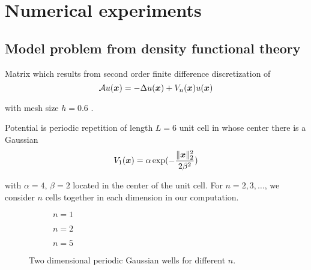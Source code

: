 \chapter{Numerical experiments}
\label{chp:5-experiments}


\section{Model problem from density functional theory}
\label{sec:5-experiments-density-function}


Matrix which results from second order finite difference discretization of
\begin{equation}
    \mathcal{A} u(\boldsymbol{x}) = - \Delta u(\boldsymbol{x}) + V_n(\boldsymbol{x}) u(\boldsymbol{x})
    \label{equ:5-experiments-electronic-hamiltonian}
\end{equation}

with mesh size $h=0.6$ \cite{lin2017randomized}.

Potential is periodic repetition of length $L=6$ unit cell in whose
center there is a Gaussian
\begin{equation}
    V_1(\boldsymbol{x}) = \alpha \exp(-\frac{\lVert \boldsymbol{x} \rVert _2^2}{ 2 \beta^2 })
\end{equation}

with $\alpha = 4$, $\beta = 2$ located in the center of the unit cell. For $n=2, 3, \dots$,
we consider $n$ cells together in each dimension in our computation.

\begin{figure}[ht]
    \begin{subfigure}[b]{0.33\columnwidth}
        
        \caption{$n=1$}
        \label{fig:5-experiments-periodic-gaussian-well-1}
    \end{subfigure}
    \begin{subfigure}[b]{0.33\columnwidth}
        
        \caption{$n=2$}
        \label{fig:5-experiments-periodic-gaussian-well-2}
    \end{subfigure}
    \begin{subfigure}[b]{0.33\columnwidth}
        
        \caption{$n=5$}
        \label{fig:5-experiments-periodic-gaussian-well-5}
    \end{subfigure}
    \caption{Two dimensional periodic Gaussian wells for different $n$.}
    \label{fig:5-experiments-periodic-gaussian-well}
\end{figure}

